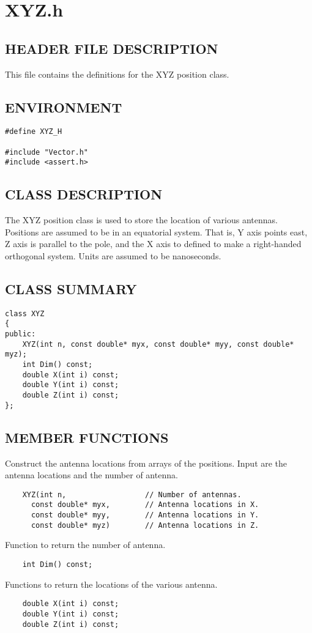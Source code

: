 \clearpage
\section{XYZ.h}

\subsection*{HEADER FILE DESCRIPTION}
 This file contains the definitions for the XYZ position class.
  
\subsection*{ENVIRONMENT}
\begin{verbatim}
#define XYZ_H

#include "Vector.h"
#include <assert.h>
\end{verbatim}

\subsection*{CLASS DESCRIPTION}
   The XYZ position class is used to store the location of various
   antennas. Positions are assumed to be in an equatorial system. That
   is, Y axis points east, Z axis is parallel to the pole, and the X
   axis to defined to make a right-handed orthogonal system. Units are
   assumed to be nanoseconds.

\subsection*{CLASS SUMMARY}
\begin{verbatim}
class XYZ
{
public:
    XYZ(int n, const double* myx, const double* myy, const double* myz);
    int Dim() const;
    double X(int i) const;
    double Y(int i) const;
    double Z(int i) const;
};
\end{verbatim}

\subsection*{MEMBER FUNCTIONS}
  
   Construct the antenna locations from arrays of the positions.
   Input are the antenna locations and the number of antenna.
\begin{verbatim}
    XYZ(int n,                  // Number of antennas.
      const double* myx,        // Antenna locations in X.
      const double* myy,        // Antenna locations in Y.
      const double* myz)        // Antenna locations in Z.
\end{verbatim}
  
   Function to return the number of antenna.
\begin{verbatim}
    int Dim() const;
\end{verbatim}

   Functions to return the locations of the various antenna.
\begin{verbatim}
    double X(int i) const;
    double Y(int i) const;
    double Z(int i) const;
\end{verbatim}
